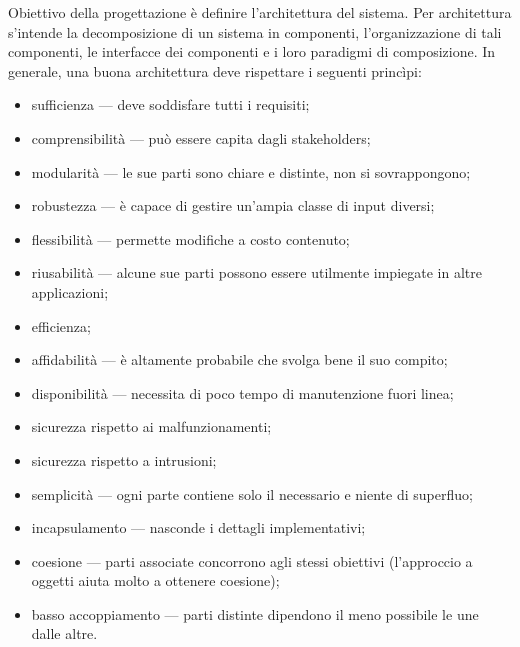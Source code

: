 \documentclass[a4paper]{article}
\begin{document}
		
Obiettivo della progettazione è definire l'architettura del sistema. Per architettura s'intende la decomposizione di un sistema in componenti, l'organizzazione di tali componenti, le interfacce dei componenti e i loro paradigmi di composizione. In generale, una buona architettura deve rispettare i seguenti princìpi:
		
	\begin{itemize}
		
			
	\item sufficienza — deve soddisfare tutti i requisiti;
			
	\item comprensibilità — può essere capita dagli stakeholders;
			
	\item modularità — le sue parti sono chiare e distinte, non si sovrappongono;
			
	\item robustezza — è capace di gestire un'ampia classe di input diversi;
			
	\item flessibilità — permette modifiche a costo contenuto;
			
	\item riusabilità — alcune sue parti possono essere utilmente impiegate in altre applicazioni;
			
	\item efficienza;
			
	\item affidabilità — è altamente probabile che svolga bene il suo compito;
			
	\item disponibilità — necessita di poco tempo di manutenzione fuori linea;
			
	\item sicurezza rispetto ai malfunzionamenti;
			
	\item sicurezza rispetto a intrusioni;
			
	\item semplicità — ogni parte contiene solo il necessario e niente di superfluo;
			
	\item incapsulamento — nasconde i dettagli implementativi;
			
	\item coesione — parti associate concorrono agli stessi obiettivi (l'approccio a oggetti aiuta molto a ottenere coesione);
			
	\item basso accoppiamento — parti distinte dipendono il meno possibile le une dalle altre.
		
	\end{itemize}
\end{document}
